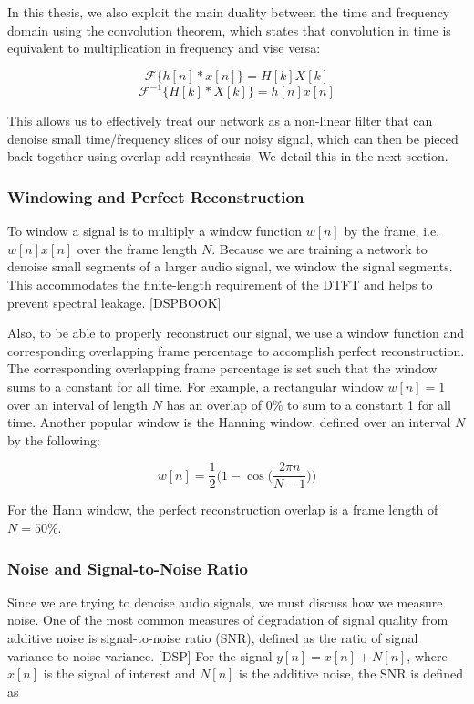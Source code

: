 In this thesis, we also exploit the main duality between the time and frequency domain using the convolution theorem, which states that convolution in time is equivalent to multiplication in frequency and vise versa:

\begin{equation}
\mathscr{F} \{h[n] * x[n]\} = H[k] X[k]
\end{equation}
\begin{equation}
\mathscr{F}^{-1} \{H[k] * X[k]\} = h[n] x[n]
\end{equation}

This allows us to effectively treat our network as a non-linear filter that can denoise small time/frequency slices of our noisy signal, which can then be pieced back together using overlap-add resynthesis. We detail this in the next section.

\subsubsection{Windowing and Perfect Reconstruction}
To window a signal is to multiply a window function $w[n]$ by the frame, i.e. $w[n]x[n]$ over the frame length $N$. Because we are training a network to denoise small segments of a larger audio signal, we window the signal segments. This accommodates the finite-length requirement of the DTFT and helps to prevent spectral leakage. [DSPBOOK]

Also, to be able to properly reconstruct our signal, we use a window function and corresponding overlapping frame percentage to accomplish perfect reconstruction. The corresponding overlapping frame percentage is set such that the window sums to a constant for all time. For example, a rectangular window $w[n]=1$ over an interval of length $N$ has an overlap of 0\% to sum to a constant 1 for all time. Another popular window is the Hanning window, defined over an interval $N$ by the following:

\begin{equation}
w[n] = \dfrac{1}{2} \bigg( 1-\cos \bigg(\dfrac{2 \pi n}{N - 1} \bigg)\bigg)
\end{equation}

For the Hann window, the perfect reconstruction overlap is a frame length of $N=50\%$.

\subsubsection{Noise and Signal-to-Noise Ratio}
Since we are trying to denoise audio signals, we must discuss how we measure noise. One of the most common measures of degradation of signal quality from additive noise is signal-to-noise ratio (SNR), defined as the ratio of signal variance to noise variance. [DSP] For the signal $y[n] = x[n] + N[n]$, where $x[n]$ is the signal of interest and $N[n]$ is the additive noise, the SNR is defined as

